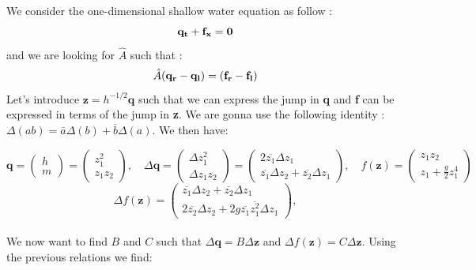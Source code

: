 \documentclass[11pt,a4paper]{article}
\begin{document}
\subsection{}
We consider the one-dimensional shallow water equation as follow :
\[ \bf{q}_t+\bf{f}_x=0\]
and we are looking for $\hat{A}$ such that :
\[\hat{A}(\bf{q}_r-q_l)=(f_r-f_l)\]
Let's introduce $\mathbf{z}=h^{-1/2}\mathbf{q}$ such that we can express the jump in \textbf{q} and \textbf{f} can be expressed in terms of the jump in \textbf{z}. We are gonna use the following identity : $\Delta(ab)=\overline{a}\Delta(b)+\overline{b}\Delta(a)$. We then have:


\begin{equation*}
     \mathbf{q} = \begin{pmatrix} h \\ m \end{pmatrix} = \begin{pmatrix} z_1^2 \\ z_1z_2 \end{pmatrix}, \quad
     \Delta \mathbf{q} = \begin{pmatrix} \Delta z_1^2 \\  \Delta z_1z_2 \end{pmatrix} = \begin{pmatrix} 2\overline{z_1}\Delta z_1 \\   \overline{z_1}\Delta z_2+\overline{z_2}\Delta z_1 \end{pmatrix} ,\quad
     f(\mathbf{z})= \begin{pmatrix} z_1z_2 \\   z_1+\frac{g}{2}z_1^4 \end{pmatrix}
\end{equation*}
\begin{equation*}
    \Delta f(\mathbf{z})= \begin{pmatrix} \overline{z_1}\Delta z_2+\overline{z_2}\Delta z_1 \\   2\overline{z_2}\Delta z_2 + 2g\overline{z_1}\overline{z_1^2}\Delta z_1 \end{pmatrix},
\end{equation*}
\\
We now want to find $B$ and $C$ such that $\Delta \mathbf{q}=B\Delta \mathbf{z}$ and $\Delta f(\mathbf{z})=C\Delta\mathbf{z}$. Using the previous relations we find:
\end{document}
